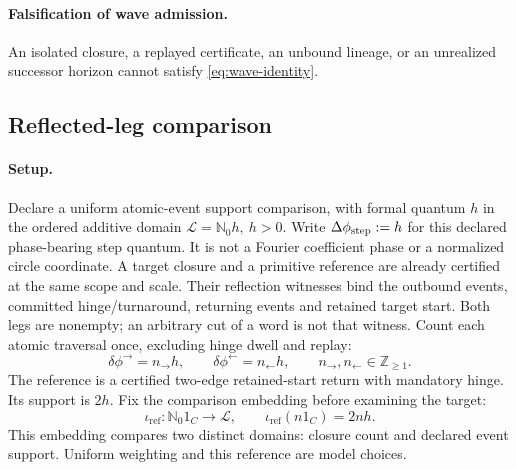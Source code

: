 \paragraph{Falsification of wave admission.}
An isolated closure, a replayed certificate, an unbound lineage, or an
unrealized successor horizon cannot satisfy \eqref{eq:wave-identity}.

\subsection{Reflected-leg comparison}
\label{subsec:reflected-leg-phase}
\paragraph{Setup.}
Declare a uniform atomic-event support comparison, with formal quantum
\(h\) in the ordered additive domain \(\mathcal L=\mathbb N_0 h,\ h>0\).
Write \(\Delta\phi_{\rm step}:=h\) for this declared phase-bearing step
quantum. It is not a Fourier coefficient phase or a normalized circle
coordinate.
A target closure and a primitive reference are already certified at the same
scope and scale. Their reflection witnesses bind the outbound events, committed
hinge/turnaround, returning events and retained target start. Both legs are
nonempty; an arbitrary cut of a word is not that witness. Count each atomic
traversal once, excluding hinge dwell and replay:
\begin{equation}
\delta\phi^{\rightarrow}=n_{\rightarrow}h,\qquad
\delta\phi^{\leftarrow}=n_{\leftarrow}h,\qquad
n_{\rightarrow},n_{\leftarrow}\in\mathbb Z_{\ge1}.
\label{eq:directed-leg-operands}
\end{equation}
The reference is a certified two-edge retained-start return with mandatory
hinge. Its support is \(2h\). Fix the comparison embedding before examining
the target:
\begin{equation}
\iota_{\mathrm{ref}}:\mathbb N_0 1_C\longrightarrow\mathcal L,
\qquad \iota_{\mathrm{ref}}(n1_C)=2nh.
\label{eq:phase-unit-embedding}
\end{equation}
This embedding compares two distinct domains: closure count and declared
event support. Uniform weighting and this reference are model choices.

